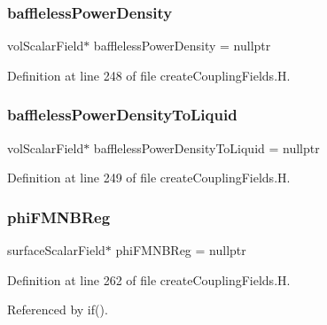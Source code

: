 \subsubsection{\texorpdfstring{baffleless\+Power\+Density}{bafflelessPowerDensity}}
{\footnotesize\ttfamily vol\+Scalar\+Field$\ast$ baffleless\+Power\+Density = nullptr}



Definition at line 248 of file create\+Coupling\+Fields.\+H.

\mbox{\label{createCouplingFields_8H_afce01877cad53b14ac949c92809f7621}} 
\subsubsection{\texorpdfstring{baffleless\+Power\+Density\+To\+Liquid}{bafflelessPowerDensityToLiquid}}
{\footnotesize\ttfamily vol\+Scalar\+Field$\ast$ baffleless\+Power\+Density\+To\+Liquid = nullptr}



Definition at line 249 of file create\+Coupling\+Fields.\+H.

\mbox{\label{createCouplingFields_8H_a48fe00c0cbc444fb8d8e43e0e5ce48bb}} 
\subsubsection{\texorpdfstring{phi\+F\+M\+N\+B\+Reg}{phiFMNBReg}}
{\footnotesize\ttfamily surface\+Scalar\+Field$\ast$ phi\+F\+M\+N\+B\+Reg = nullptr}



Definition at line 262 of file create\+Coupling\+Fields.\+H.



Referenced by if().

